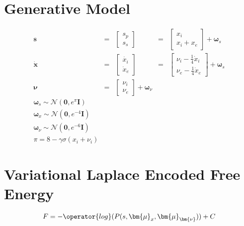 \documentclass[11pt]{article}
\begin{document}
\section*{Generative Model} 
$$
\begin{array}{lllll}
    \mathbf{s} &=&  \left[\begin{array}{c} s_p \\ s_s\end{array}\right] &=&
    \left[\begin{array}{c} x_i \\ x_i + x_e \end{array}\right] +
    \boldsymbol{\omega}_s \\ 
    \mathbf{\dot{x}} &=&  \left[\begin{array}{c} \dot{x_i} \\ \dot{x}_e
    \end{array}\right]  &=& \left[\begin{array}{c} \nu_i -\frac{1}{4} \dot{x}_i\\
    \nu_e -\frac{1}{4} \dot{x}_e\end{array}\right] + \boldsymbol{\omega}_s \\ 
    \boldsymbol{\nu} &=& \left[\begin{array}{c} \nu_i \\ \nu_e \end{array}\right]
    + \boldsymbol{\omega}_{\nu}\\
    \boldsymbol{\omega}_s \sim \mathcal{N}(\mathbf{0}, e^{\pi} \mathbf{I})\\
    \boldsymbol{\omega}_x \sim \mathcal{N}(\mathbf{0}, e^{-4} \mathbf{I})\\
    \boldsymbol{\omega}_\nu \sim \mathcal{N}(\mathbf{0}, e^{-6} \mathbf{I})\\
    \pi = 8-\gamma\sigma(x_i + \nu_i)
\end{array}
$$

\section*{Variational Laplace Encoded Free Energy}

$$
    \begin{array}{l}
        F = -\operator{log}(P(s,\bm{\mu}_x, \bm{\mu}_\bm{\nu})) + C \\
    \end{array}
$$


\end{document}
